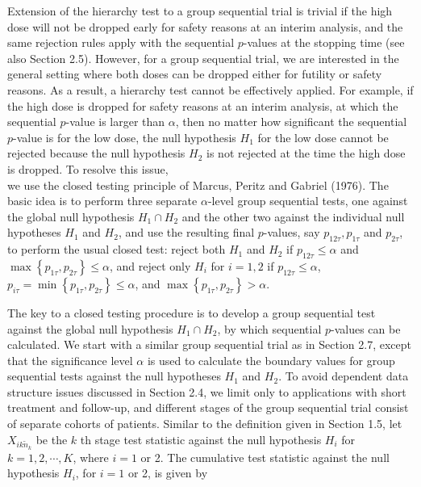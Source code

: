 \documentclass[10pt]{article}
\begin{document}
Extension of the hierarchy test to a group sequential trial is trivial if the high dose will not be dropped early for safety reasons at an interim analysis, and the same rejection rules apply with the sequential $p$-values at the stopping time (see also Section 2.5). However, for a group sequential trial, we are interested in the general setting where both doses can be dropped either for futility or safety reasons. As a result, a hierarchy test cannot be effectively applied. For example, if the high dose is dropped for safety reasons at an interim analysis, at which the sequential $p$-value is larger than $\alpha$, then no matter how significant the sequential $p$-value is for the low dose, the null hypothesis $H_{1}$ for the low dose cannot be rejected because the null hypothesis $H_{2}$ is not rejected at the time the high dose is dropped. To resolve this issue,\\
we use the closed testing principle of Marcus, Peritz and Gabriel (1976). The basic idea is to perform three separate $\alpha$-level group sequential tests, one against the global null hypothesis $H_{1} \cap H_{2}$ and the other two against the individual null hypotheses $H_{1}$ and $H_{2}$, and use the resulting final $p$-values, say $p_{12 \tau}, p_{1 \tau}$ and $p_{2 \tau}$, to perform the usual closed test: reject both $H_{1}$ and $H_{2}$ if $p_{12 \tau} \leq \alpha$ and $\max \left\{p_{1 \tau}, p_{2 \tau}\right\} \leq \alpha$, and reject only $H_{i}$ for $i=1,2$ if $p_{12 \tau} \leq \alpha$, $p_{i \tau}=\min \left\{p_{1 \tau}, p_{2 \tau}\right\} \leq \alpha$, and $\max \left\{p_{1 \tau}, p_{2 \tau}\right\}>\alpha$.

The key to a closed testing procedure is to develop a group sequential test against the global null hypothesis $H_{1} \cap H_{2}$, by which sequential $p$-values can be calculated. We start with a similar group sequential trial as in Section 2.7, except that the significance level $\alpha$ is used to calculate the boundary values for group sequential tests against the null hypotheses $H_{1}$ and $H_{2}$. To avoid dependent data structure issues discussed in Section 2.4, we limit only to applications with short treatment and follow-up, and different stages of the group sequential trial consist of separate cohorts of patients. Similar to the definition given in Section 1.5, let $X_{i k \tilde{n}_{k}}$ be the $k$ th stage test statistic against the null hypothesis $H_{i}$ for $k=1,2, \cdots, K$, where $i=1$ or 2. The cumulative test statistic against the null hypothesis $H_{i}$, for $i=1$ or 2, is given by
\end{document}
